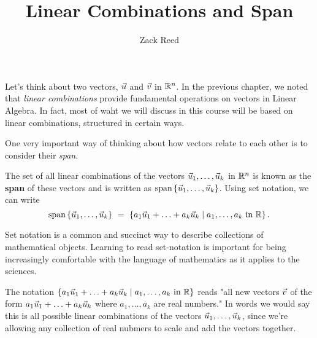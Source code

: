 \documentclass{ximera}
\author{Zack Reed}
\title{Linear Combinations and Span}
\begin{document}
\begin{abstract}

\end{abstract}
\maketitle

Let's think about two vectors, $\vec{u}$ and $\vec{v}$ in $\mathbb{R}^n$. In the previous chapter, we noted that \emph{linear combinations} provide fundamental operations on vectors in Linear Algebra. In fact, most of waht we will discuss in this course will be based on linear combinations, structured in certain ways.

\begin{exploration}

One very important way of thinking about how vectors relate to each other is to consider their \emph{span}.


\begin{definition}
  The set of all linear combinations of the vectors
  $\vec{u}_1, \ldots,\vec{u}_k$ in $\mathbb{R}^n$ is known as the
  \textbf{span}%
   of these vectors and is written as
  $\text{span}\left\{\vec{u}_1,\ldots,\vec{u}_k\right\}$. Using set notation, we
  can write
  \begin{equation*}
    \text{span}\left\{\vec{u}_1,\ldots,\vec{u}_k\right\}
    ~=~ \left\{a_1\vec{u}_1+\ldots+a_k\vec{u}_k \mid a_1,\ldots,a_k\text{ in }\mathbb{R}\right\}.
  \end{equation*}
  \begin{hint}
  
    Set notation is a common and succinct way to describe collections of mathematical objects. Learning to read set-notation is important for being increasingly comfortable with the language of mathematics as it applies to the sciences.

    The notation $\left\{a_1\vec{u}_1+\ldots+a_k\vec{u}_k \mid a_1,\ldots,a_k\text{ in }\mathbb{R}\right\}$ reads "all new vectors $\vec{v}$ of the form $a_1\vec{u}_1+\ldots+a_k\vec{u}_k$ where $a_1,\ldots,a_k$ are real numbers." In words we would say this is all possible linear combinations of the vectors $\vec{u}_1,\ldots,\vec{u}_k$, since we're allowing any collection of real nubmers to scale and add the vectors together.

  \end{hint}
\end{definition}


\end{exploration}
\end{document}
